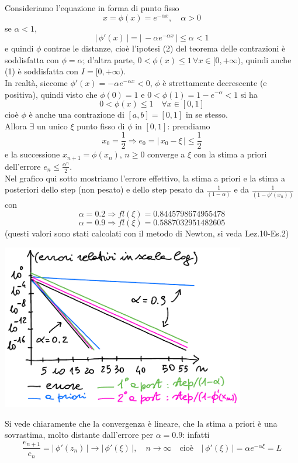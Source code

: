 \documentclass[12pt]{article}
\begin{document}
Consideriamo l'equazione in forma di punto fisso
\[x = \phi(x) = e^{-\alpha x}, \quad \alpha>0\]
se \underline{$\alpha<1$}, \[|\,\phi'(x)\,| = |\,-\alpha e^{-\alpha x}\,| \le \alpha < 1\]
e quindi $\phi$ contrae le distanze, cioè l'ipotesi (2) del teorema delle contrazioni è soddisfatta con $\phi = \alpha$; d'altra parte, $0<\phi(x) \le 1\, \forall x \in [0,+\infty)$, quindi anche (1) è soddisfatta con $I = [0,+\infty)$.\\
In realtà, siccome $\phi'(x)=-\alpha e^{-\alpha x}<0$, $\phi$ è strettamente decrescente (e positiva), quindi visto che $\phi(0)=1$ e $0<\phi(1)=1-e^{-\alpha}<1$ si ha
\[0 < \phi(x) \le 1 \quad \forall x \in [0,1]\]
cioè $\phi$ è anche una contrazione di $[a,b] = [0,1]$ in se stesso.\\
Allora $\exists$ un unico $\xi$ punto fisso di $\phi$ in $[0,1]$: prendiamo 
\[x_0 = \frac{1}{2} \Longrightarrow e_0 = |\,x_0 - \xi\,| \le \frac{1}{2}\]
e la successione $x_{n+1}=\phi(x_n)$, $n \ge 0$ converge a $\xi$ con la stima a priori dell'errore $e_n \le \frac{\alpha^n}{2}$.\\
Nel grafico qui sotto mostriamo l'errore effettivo, la stima a priori e la stima a posteriori dello step (non pesato) e dello step pesato da $\frac{1}{(1-\alpha)}$ e da $\frac{1}{(1-\phi'(x_n))}$ con
\[\alpha = 0.2 \Longrightarrow fl(\xi) = 0.8445798674955478\]
\[\alpha = 0.9 \Longrightarrow fl(\xi) = 0.5887032951482605\]
(questi valori sono stati calcolati con il metodo di Newton, si veda Lez.10-Es.2)
\begin{center}
    \includegraphics[width=0.8\textwidth]{pag16}
\end{center}
Si vede chiaramente che la convergenza è lineare, che la stima a priori è una sovrastima, molto distante dall'errore per $\alpha = 0.9$: infatti
\[\frac{e_{n+1}}{e_n} = |\,\phi'(z_n)\,| \to |\,\phi'(\xi)\,|, \quad n \to \infty \quad \text{cioè} \quad |\,\phi'(\xi)\,| = \alpha e^{-\alpha \xi} = L\]
\end{document}
